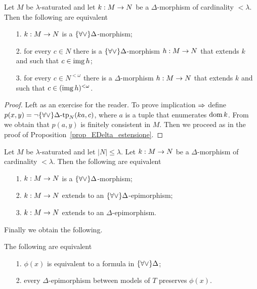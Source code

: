 \begin{proposition}\label{prop_ADelta_estensione}
Let $M$ be $\lambda$-saturated and let $k:M\rightarrow N$ be a $\Delta$-morphism of cardinality $<\lambda$. Then the following are equivalent
\begin{itemize}
\item[1.] $k:M\rightarrow N$ is a $\{\forall\vee\}\Delta$-morphism;
\item[2.] for every $c\in N$ there is a $\{\forall\vee\}\Delta$-morphism $h:M\rightarrow N$ that extends $k$ and such that $c\in\mathop{\rm img} h$;
\item[3.] for every $c\in N^{<\omega}$ there is a $\Delta$-morphism $h:M\rightarrow N$ that extends $k$ and such that $c\in(\mathop{\rm img} h)^{<\omega}$.
\end{itemize}
\end{proposition}

\begin{proof} Left as an exercise for the reader. To prove implication $\Rightarrow$ define $p(x,y)=\neg\{\forall\vee\}\Delta\mbox{-}\textrm{tp}_N (ka,c)$, where $a$ is a tuple that enumerates $\mathop{\rm dom} k$. From  we obtain that $p(a,y)$ is finitely consistent in $M$. Then we proceed as in the proof of Proposition~\ref{prop_EDelta_estensione}.
\end{proof}

\begin{corollary}\label{corol_EDelta_estensione}
Let $M$ be $\lambda$-saturated and let $|N|\le\lambda$. Let $k:M\rightarrow N$ be a $\Delta$-morphism of cardinality $<\lambda$. Then the following are equivalent
\begin{itemize}
\item[1.] $k:M\rightarrow N$ is a $\{\forall\vee\}\Delta$-morphism;
\item[2.] $k:M\rightarrow N$ extends to an $\{\forall\vee\}\Delta$-epimorphism;
\item[3.] $k:M\rightarrow N$ extends to an $\Delta$-epimorphism.\QED
\end{itemize}
\end{corollary}

Finally we obtain the following.

\begin{theorem}
The following are equivalent
\begin{itemize}
\item[1.] $\phi(x)$ is equivalent to a formula in $\{\forall\vee\}\Delta$;
\item[2.] every $\Delta$-epimorphism between models of $T$ preserves $\phi(x)$.\QED
\end{itemize}
\end{theorem}










